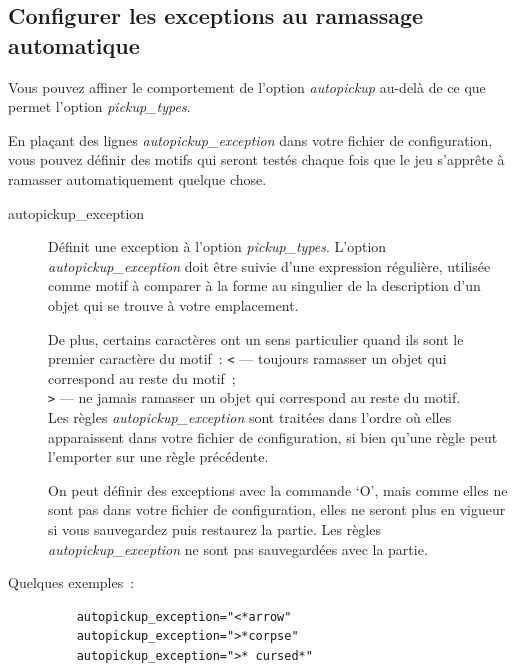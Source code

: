 \documentclass[titlepage]{article}
\begin{document}
\subsection{Configurer les exceptions au ramassage automatique}



Vous pouvez affiner le comportement de l'option
\textit{autopickup}
au-delà de ce que permet l'option
\textit{pickup\_types}.


En plaçant des lignes
\textit{autopickup\_exception}
dans votre fichier de configuration, vous pouvez définir des motifs qui
seront testés chaque fois que le jeu s'apprête à ramasser automatiquement
quelque chose.

\begin{description}
\item[{autopickup\_exception}]
Définit une exception à l'option
\textit{pickup\_types}.
L'option
\textit{autopickup\_exception}
doit être suivie d'une expression régulière, utilisée comme motif à
comparer à la forme au singulier de la description d'un objet qui se
trouve à votre emplacement.


De plus, certains caractères ont un sens particulier quand ils sont le
premier caractère du motif~:
\texttt{\textless{}} --- toujours ramasser un objet qui correspond au reste du motif~;\\
\texttt{\textgreater{}} --- ne jamais ramasser un objet qui correspond au reste du motif.\\
Les règles
\textit{autopickup\_exception}
sont traitées dans l'ordre où elles apparaissent dans votre fichier de
configuration, si bien qu'une règle peut l'emporter sur une règle
précédente.


On peut définir des exceptions avec la commande `O', mais comme
elles ne sont pas dans votre fichier de configuration, elles ne seront
plus en vigueur si vous sauvegardez puis restaurez la partie.
Les règles
\textit{autopickup\_exception}
ne sont pas sauvegardées avec la partie.

\item[{Quelques exemples~:}]
\begin{verbatim}
    autopickup_exception="<*arrow"
    autopickup_exception=">*corpse"
    autopickup_exception=">* cursed*"
\end{verbatim}

\end{description}
\end{document}
